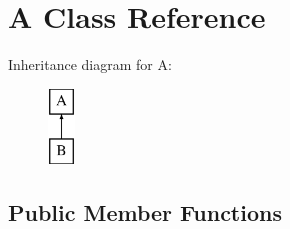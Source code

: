 \hypertarget{classA}{\section{A Class Reference}
\label{classA}
}
Inheritance diagram for A\-:\begin{figure}[H]
\begin{center}
\leavevmode
\includegraphics[height=2.000000cm]{classA}
\end{center}
\end{figure}
\subsection*{Public Member Functions}
